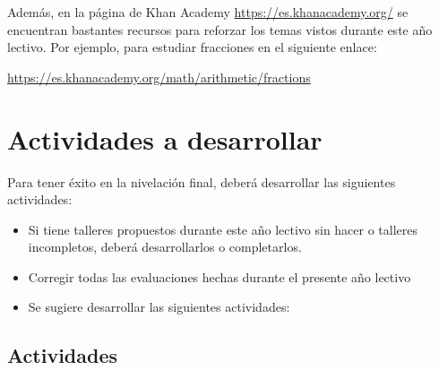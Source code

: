 \documentclass[letterpaper,11pt,twoside]{article}
\begin{document}
Además, en la página de Khan Academy \url{https://es.khanacademy.org/} se encuentran bastantes recursos para reforzar los temas vistos durante este año lectivo. Por ejemplo, para estudiar fracciones en el siguiente enlace:

\url{https://es.khanacademy.org/math/arithmetic/fractions}
\section*{Actividades a desarrollar}
Para tener éxito en la nivelación final, deberá desarrollar las siguientes actividades:
\begin{itemize}
\item Si tiene talleres propuestos durante este año lectivo sin hacer o talleres incompletos, deberá desarrollarlos o completarlos.
\item Corregir todas las evaluaciones hechas durante el presente año lectivo
\item Se sugiere desarrollar las siguientes actividades:
\end{itemize}
\subsection*{Actividades}
\end{document}
